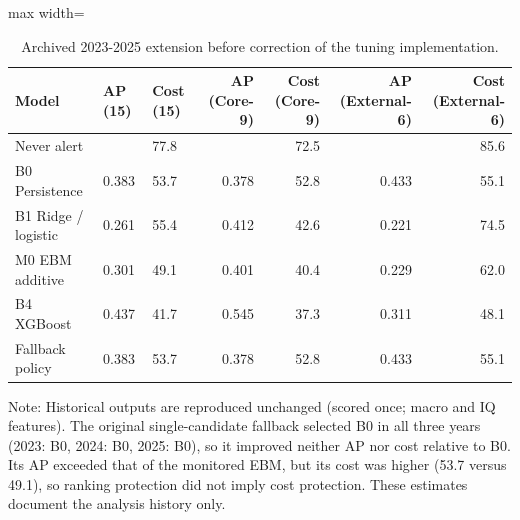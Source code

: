 \documentclass[preprint,12pt,authoryear]{elsarticle}
\begin{document}
\begin{table}[!htbp]
\centering
\scriptsize
\setlength{\tabcolsep}{3pt}
\caption{Archived 2023-2025 extension before correction of the tuning implementation.}
\label{tab:arch}
\begin{adjustbox}{max width=\textwidth}
\begin{tabular}{lllrrrr}
\toprule
Model & AP (15) & Cost (15) & AP (Core-9) & Cost (Core-9) & AP (External-6) & Cost (External-6) \\
\midrule
Never alert &  & 77.8 &  & 72.5 &  & 85.6 \\
B0 Persistence & 0.383 & 53.7 & 0.378 & 52.8 & 0.433 & 55.1 \\
B1 Ridge / logistic & 0.261 & 55.4 & 0.412 & 42.6 & 0.221 & 74.5 \\
M0 EBM additive & 0.301 & 49.1 & 0.401 & 40.4 & 0.229 & 62.0 \\
B4 XGBoost & 0.437 & 41.7 & 0.545 & 37.3 & 0.311 & 48.1 \\
Fallback policy & 0.383 & 53.7 & 0.378 & 52.8 & 0.433 & 55.1 \\
\bottomrule
\end{tabular}
\end{adjustbox}
\par\vspace{2pt}\parbox{0.95\linewidth}{\scriptsize Note: Historical outputs are reproduced unchanged (scored once; macro and IQ features). The original single-candidate fallback selected B0 in all three years (2023: B0, 2024: B0, 2025: B0), so it improved neither AP nor cost relative to B0. Its AP exceeded that of the monitored EBM, but its cost was higher (53.7 versus 49.1), so ranking protection did not imply cost protection. These estimates document the analysis history only.}
\end{table}
\end{document}
